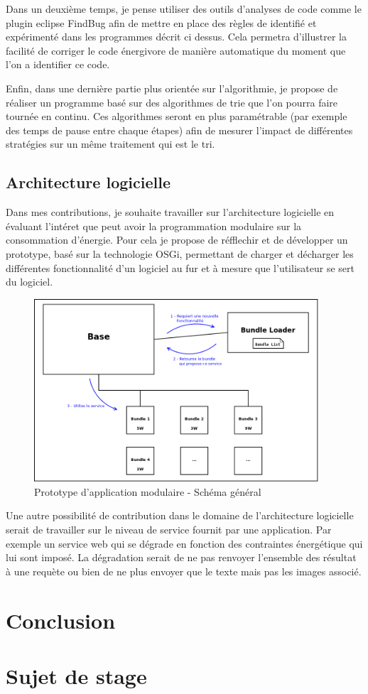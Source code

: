 \documentclass[a4paper, 11pt]{report}
\begin{document}
Dans un deuxième temps, je pense utiliser des outils d'analyses de code comme le plugin eclipse FindBug afin de mettre en place des règles de identifié et expérimenté dans les programmes décrit ci dessus. Cela permetra d'illustrer la facilité de corriger le code énergivore de manière automatique du moment que l'on a identifier ce code.

Enfin, dans une dernière partie plus orientée sur l'algorithmie, je propose de réaliser un programme basé sur des algorithmes de trie que l'on pourra faire tournée en continu. Ces algorithmes seront en plus paramétrable (par exemple des temps de pause entre chaque étapes) afin de mesurer l'impact de différentes stratégies sur un même traitement qui est le tri.

\section{Architecture logicielle}
Dans mes contributions, je souhaite travailler sur l'architecture logicielle en évaluant l'intéret que peut avoir la programmation modulaire sur la consommation d'énergie. Pour cela je propose de réfflechir et de développer un prototype, basé sur la technologie OSGi, permettant de charger et décharger les différentes fonctionnalité d'un logiciel au fur et à mesure que l'utilisateur se sert du logiciel.

\begin{figure}
    \begin{center}
	\includegraphics[width=300pt]{../../Figures/OSGi/EcoPattern_General_Figure}
	\caption{Prototype d'application modulaire - Schéma général}
    \end{center}
\end{figure}

Une autre possibilité de contribution dans le domaine de l'architecture logicielle serait de travailler sur le niveau de service fournit par une application. Par exemple un service web qui se dégrade en fonction des contraintes énergétique qui lui sont imposé. La dégradation serait de ne pas renvoyer l'ensemble des résultat à une requète ou bien de ne plus envoyer que le texte mais pas les images associé.

\chapter{Conclusion}

\listoffigures{}
\listoftables{}
\appendix

\chapter{Sujet de stage}

\end{document}
